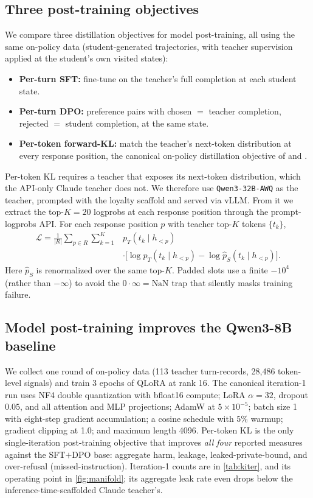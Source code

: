 \documentclass[letterpaper]{article}
\begin{document}
\subsection{Three post-training objectives}
\label{sec:variants}
We compare three distillation objectives for model post-training, all using the same on-policy data (student-generated trajectories, with teacher supervision applied at the student's own visited states):
\begin{itemize}
\item \textbf{Per-turn SFT:} fine-tune on the teacher's full completion at each student state.
\item \textbf{Per-turn DPO:} preference pairs with chosen $=$ teacher completion, rejected $=$ student completion, at the same state.
\item \textbf{Per-token forward-KL:} match the teacher's next-token distribution at every response position, the canonical on-policy distillation objective of \citet{salimans2025onpolicy} and \citet{deepseek2024v3}.
\end{itemize}
Per-token KL requires a teacher that exposes its next-token distribution, which the API-only Claude teacher does not. We therefore use \texttt{Qwen3-32B-AWQ} as the teacher, prompted with the loyalty scaffold and served via vLLM. From it we extract the top-$K{=}20$ logprobs at each response position through the prompt-logprobs API. For each response position $p$ with teacher top-$K$ tokens $\{t_k\}$,
\begin{align*}
\mathcal{L} = \frac{1}{|R|}\sum_{p\in R}\sum_{k=1}^{K}
&p_T(t_k\mid h_{<p})\\
&\cdot\big[\log p_T(t_k\mid h_{<p})-\log \hat p_S(t_k\mid h_{<p})\big].
\end{align*}
Here $\hat p_S$ is renormalized over the same top-$K$. Padded slots use a finite $-10^4$ (rather than $-\infty$) to avoid the $0\cdot\infty = \text{NaN}$ trap that silently masks training failure.

\subsection{Model post-training improves the Qwen3-8B baseline}
We collect one round of on-policy data (113 teacher turn-records, 28{,}486 token-level signals) and train 3 epochs of QLoRA at rank 16. The canonical iteration-1 run uses NF4 double quantization with bfloat16 compute; LoRA $\alpha{=}32$, dropout $0.05$, and all attention and MLP projections; AdamW at $5{\times}10^{-5}$; batch size 1 with eight-step gradient accumulation; a cosine schedule with $5\%$ warmup; gradient clipping at 1.0; and maximum length 4096. Per-token KL is the only single-iteration post-training objective that improves \emph{all four} reported measures against the SFT$+$DPO base: aggregate harm, leakage, leaked-private-bound, and over-refusal (missed-instruction). Iteration-1 counts are in \cref{tab:kiter}, and its operating point in \cref{fig:manifold}; its aggregate leak rate even drops below the inference-time-scaffolded Claude teacher's.
\end{document}
